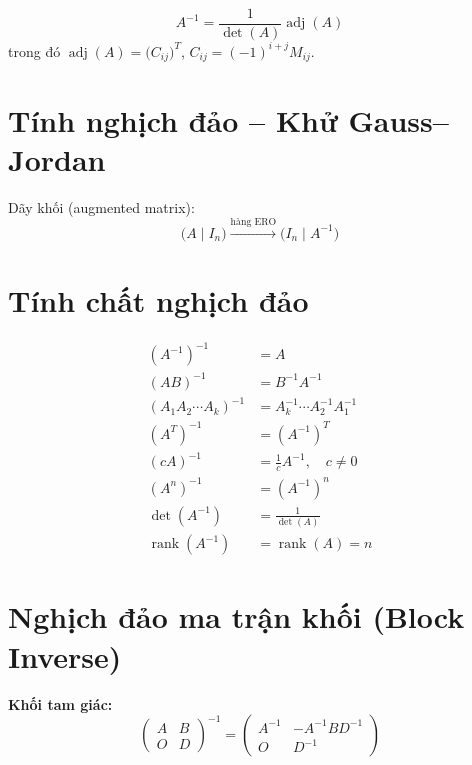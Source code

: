 \[
A^{-1} = \frac{1}{\det(A)} \operatorname{adj}(A)
\]
trong đó $\operatorname{adj}(A) = \bigl(C_{ij}\bigr)^T$, $C_{ij} = (-1)^{i+j} M_{ij}$.

\section{Tính nghịch đảo -- Khử Gauss--Jordan}

Dãy khối (augmented matrix):
\[
\bigl(A \mid I_n\bigr) \xrightarrow{\text{hàng ERO}} \bigl(I_n \mid A^{-1}\bigr)
\]

\section{Tính chất nghịch đảo}

\begin{align}
(A^{-1})^{-1} &= A \\
(AB)^{-1} &= B^{-1} A^{-1} \\
(A_1 A_2 \cdots A_k)^{-1} &= A_k^{-1} \cdots A_2^{-1} A_1^{-1} \\
(A^T)^{-1} &= (A^{-1})^T \\
(cA)^{-1} &= \frac{1}{c} A^{-1}, \quad c \neq 0 \\
(A^n)^{-1} &= (A^{-1})^n \\
\det(A^{-1}) &= \frac{1}{\det(A)} \\
\operatorname{rank}(A^{-1}) &= \operatorname{rank}(A) = n
\end{align}

\section{Nghịch đảo ma trận khối (Block Inverse)}

\textbf{Khối tam giác:}
\[
\begin{pmatrix} A & B \\ O & D \end{pmatrix}^{-1}
= \begin{pmatrix} A^{-1} & -A^{-1}BD^{-1} \\ O & D^{-1} \end{pmatrix}
\]

